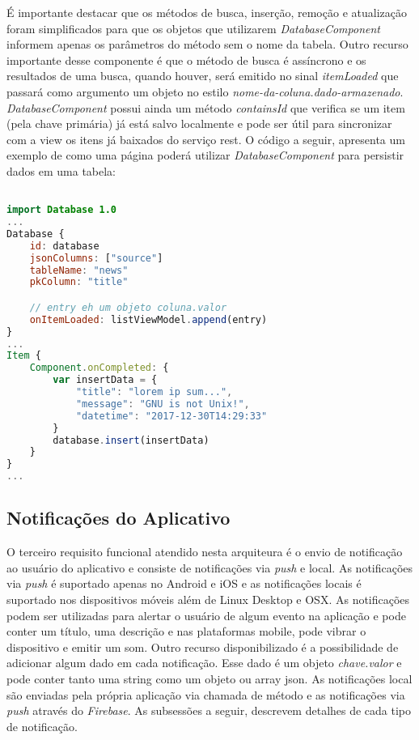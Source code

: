 É importante destacar que os métodos de busca, inserção, remoção e atualização foram simplificados para que os objetos que utilizarem \textit{DatabaseComponent} informem apenas os parâmetros do método sem o nome da tabela. Outro recurso importante desse componente é que o método de busca é assíncrono e os resultados de uma busca, quando houver, será emitido no sinal \textit{itemLoaded} que passará como argumento um objeto no estilo \textit{nome-da-coluna.dado-armazenado}. \textit{DatabaseComponent} possui ainda um método \textit{containsId} que verifica se um item (pela chave primária) já está salvo localmente e pode ser útil para sincronizar com a view os itens já baixados do serviço rest. O código a seguir, apresenta um exemplo de como uma página poderá utilizar \textit{DatabaseComponent} para persistir dados em uma tabela:

\begin{center}
\begin{lstlisting}[language=qml]

import Database 1.0
...
Database {
	id: database
	jsonColumns: ["source"]
	tableName: "news"
	pkColumn: "title"

	// entry eh um objeto coluna.valor
	onItemLoaded: listViewModel.append(entry)
}
...
Item {
	Component.onCompleted: {
		var insertData = {
			"title": "lorem ip sum...",
			"message": "GNU is not Unix!",
			"datetime": "2017-12-30T14:29:33"
		}
		database.insert(insertData)
	}
}
...
\end{lstlisting}
\end{center}


\subsection{Notificações do Aplicativo}
O terceiro requisito funcional atendido nesta arquiteura é o envio de notificação ao usuário do aplicativo e consiste de notificações via \textit{push} e local. As notificações via \textit{push} é suportado apenas no Android e iOS e as notificações locais é suportado nos dispositivos móveis além de Linux Desktop e OSX. As notificações podem ser utilizadas para alertar o usuário de algum evento na aplicação e pode conter um título, uma descrição e nas plataformas mobile, pode vibrar o dispositivo e emitir um som. Outro recurso disponibilizado é a possibilidade de adicionar algum dado em cada notificação. Esse dado é um objeto \textit{chave.valor} e pode conter tanto uma string como um objeto ou array json. As notificações local são enviadas pela própria aplicação via chamada de método e as notificações via \textit{push} através do \textit{Firebase}. As subsessões a seguir, descrevem detalhes de cada tipo de notificação.

